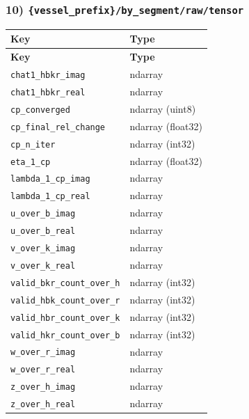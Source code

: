 \documentclass[11pt]{article}
\begin{document}
\subsubsection*{10) \texttt{\{vessel\_\allowbreak{}prefix\}/\allowbreak{}by\_\allowbreak{}segment/\allowbreak{}raw/\allowbreak{}tensor}}
\begin{longtable}{|p{}|p{}|}
\hline
\textbf{Key} & \textbf{Type} \\ \hline
\endfirsthead
\hline
\textbf{Key} & \textbf{Type} \\ \hline
\endhead
\texttt{chat1\_\allowbreak{}hbkr\_\allowbreak{}imag} & ndarray \\ \hline
\texttt{chat1\_\allowbreak{}hbkr\_\allowbreak{}real} & ndarray \\ \hline
\texttt{cp\_\allowbreak{}converged} & ndarray (uint8) \\ \hline
\texttt{cp\_\allowbreak{}final\_\allowbreak{}rel\_\allowbreak{}change} & ndarray (float32) \\ \hline
\texttt{cp\_\allowbreak{}n\_\allowbreak{}iter} & ndarray (int32) \\ \hline
\texttt{eta\_\allowbreak{}1\_\allowbreak{}cp} & ndarray (float32) \\ \hline
\texttt{lambda\_\allowbreak{}1\_\allowbreak{}cp\_\allowbreak{}imag} & ndarray \\ \hline
\texttt{lambda\_\allowbreak{}1\_\allowbreak{}cp\_\allowbreak{}real} & ndarray \\ \hline
\texttt{u\_\allowbreak{}over\_\allowbreak{}b\_\allowbreak{}imag} & ndarray \\ \hline
\texttt{u\_\allowbreak{}over\_\allowbreak{}b\_\allowbreak{}real} & ndarray \\ \hline
\texttt{v\_\allowbreak{}over\_\allowbreak{}k\_\allowbreak{}imag} & ndarray \\ \hline
\texttt{v\_\allowbreak{}over\_\allowbreak{}k\_\allowbreak{}real} & ndarray \\ \hline
\texttt{valid\_\allowbreak{}bkr\_\allowbreak{}count\_\allowbreak{}over\_\allowbreak{}h} & ndarray (int32) \\ \hline
\texttt{valid\_\allowbreak{}hbk\_\allowbreak{}count\_\allowbreak{}over\_\allowbreak{}r} & ndarray (int32) \\ \hline
\texttt{valid\_\allowbreak{}hbr\_\allowbreak{}count\_\allowbreak{}over\_\allowbreak{}k} & ndarray (int32) \\ \hline
\texttt{valid\_\allowbreak{}hkr\_\allowbreak{}count\_\allowbreak{}over\_\allowbreak{}b} & ndarray (int32) \\ \hline
\texttt{w\_\allowbreak{}over\_\allowbreak{}r\_\allowbreak{}imag} & ndarray \\ \hline
\texttt{w\_\allowbreak{}over\_\allowbreak{}r\_\allowbreak{}real} & ndarray \\ \hline
\texttt{z\_\allowbreak{}over\_\allowbreak{}h\_\allowbreak{}imag} & ndarray \\ \hline
\texttt{z\_\allowbreak{}over\_\allowbreak{}h\_\allowbreak{}real} & ndarray \\ \hline
\end{longtable}
\end{document}
